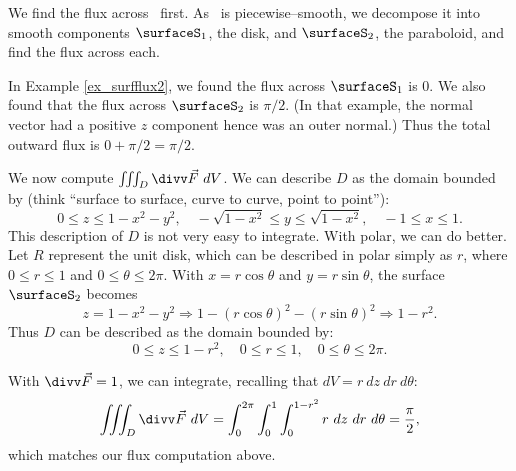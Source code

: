 {We find the flux across \surfaceS\ first. As \surfaceS\ is piecewise--smooth, we decompose it into smooth components $\surfaceS_1$, the disk, and $\surfaceS_2$, the paraboloid, and find the flux across each.

In Example \ref{ex_surfflux2}, we found the flux across $\surfaceS_1$ is 0. We also found that the flux across $\surfaceS_2$ is $\pi/2$. (In that example, the normal vector had a positive $z$ component hence was an outer normal.) Thus the total outward flux is $0+\pi/2 = \pi/2$.

We now compute $\iiint_D \divv \vec F\ dV$. We can describe $D$ as the domain bounded by (think ``surface to surface, curve to curve, point to point''):
$$0\leq z\leq 1-x^2-y^2, \quad -\sqrt{1-x^2}\leq y\leq \sqrt{1-x^2},\quad -1\leq x\leq 1.$$
This description of $D$ is not very easy to integrate. With polar, we can do better. Let $R$ represent the unit disk, which can be described in polar simply as $r$, where $0\leq r\leq 1$ and $0\leq \theta\leq 2\pi$. With $x=r\cos \theta$ and $y=r\sin\theta$, the surface $\surfaceS_2$ becomes
$$z=1-x^2-y^2 \Rightarrow 1-(r\cos\theta)^2-(r\sin\theta)^2 \Rightarrow 1-r^2.$$ Thus $D$ can be described as the domain bounded by:
$$0\leq z\leq 1-r^2,\quad 0\leq r\leq 1,\quad 0\leq \theta\leq 2\pi.$$

With $\divv \vec F = 1$, we can integrate, recalling that $dV = r\ dz\ dr\ d\theta$:
$$\iiint_D\divv \vec F\ dV = \int_0^{2\pi}\int_0^1\int_0^{1-r^2} r\ dz\ dr\ d\theta = \frac{\pi}2,$$
which matches our flux computation above.
}\\

